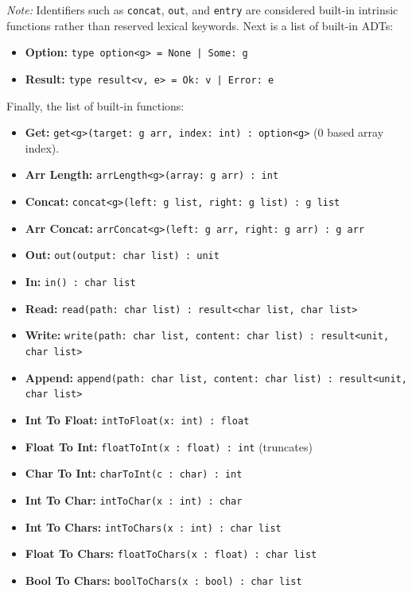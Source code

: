 \documentclass[11pt, a4paper]{article}
\begin{document}
\noindent \textit{Note:} Identifiers such as \texttt{concat}, \texttt{out}, and \texttt{entry} are considered built-in intrinsic functions rather than reserved lexical keywords. Next is a list of built-in ADTs:

\begin{itemize}
    \item \textbf{Option:} \texttt{type option<g> = None | Some: g}
    \item \textbf{Result:} \texttt{type result<v, e> = Ok: v | Error: e}
\end{itemize}

Finally, the list of built-in functions:
\begin{itemize}
    \item \textbf{Get:} \texttt{get<g>(target: g arr, index: int) : option<g>} (0 based array index).
    \item \textbf{Arr Length:} \texttt{arrLength<g>(array: g arr) : int}
    \item \textbf{Concat:} \texttt{concat<g>(left: g list, right: g list) : g list}
    \item \textbf{Arr Concat:} \texttt{arrConcat<g>(left: g arr, right: g arr) : g arr}
    \item \textbf{Out: } \texttt{out(output: char list) : unit}
    \item \textbf{In: } \texttt{in() : char list}
    \item \textbf{Read: } \texttt{read(path: char list) : result<char list, char list>}
    \item \textbf{Write: } \texttt{write(path: char list, content: char list) : result<unit, char list>}
    \item \textbf{Append: } \texttt{append(path: char list, content: char list) : result<unit, char list>}
    \item \textbf{Int To Float: } \texttt{intToFloat(x: int) : float}
    \item \textbf{Float To Int: } \texttt{floatToInt(x : float) : int} (truncates)
    \item \textbf{Char To Int: } \texttt{charToInt(c : char) : int}
    \item \textbf{Int To Char: } \texttt{intToChar(x : int) : char}
    \item \textbf{Int To Chars: } \texttt{intToChars(x : int) : char list}
    \item \textbf{Float To Chars: } \texttt{floatToChars(x : float) : char list}
    \item \textbf{Bool To Chars: } \texttt{boolToChars(x : bool) : char list}

\end{itemize}
\end{document}
